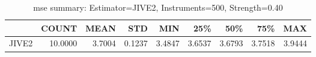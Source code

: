 \begin{table}[ht]
\centering
\caption{mse summary: Estimator=JIVE2, Instruments=500, Strength=0.40}
\begin{tabular}{lrrrrrrrr}
\toprule
 & COUNT & MEAN & STD & MIN & 25\% & 50\% & 75\% & MAX \\
\midrule
JIVE2 & 10.0000 & 3.7004 & 0.1237 & 3.4847 & 3.6537 & 3.6793 & 3.7518 & 3.9444 \\
\bottomrule
\end{tabular}
\end{table}

